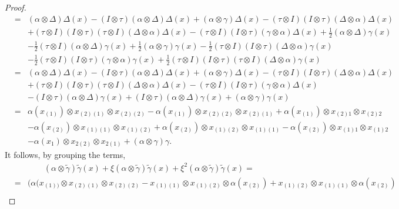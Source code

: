 \documentclass{article}
\theoremstyle{definition}
\theoremstyle{remark}
\numberwithin{equation}{section}
\begin{document}
\begin{proof}
\begin{eqnarray}
&=&(\alpha\otimes\Delta)\Delta(x)-(I\otimes\tau)(\alpha\otimes\Delta)\Delta(x)+(\alpha\otimes\gamma)\Delta(x)
-(\tau\otimes I)(I\otimes\tau)(\Delta\otimes \alpha)\Delta(x)\nonumber\\
&&+(\tau\otimes I)(I\otimes\tau)(\tau\otimes I)(\Delta\otimes \alpha)\Delta(x)
-(\tau\otimes I)(I\otimes\tau)(\gamma\otimes \alpha)\Delta(x)+\frac{1}{2}(\alpha\otimes\Delta)\gamma(x)\nonumber\\
&&-\frac{1}{2}(\tau\otimes I)(\alpha\otimes\Delta)\gamma(x)+\frac{1}{2}(\alpha\otimes\gamma)\gamma(x)
-\frac{1}{2}(\tau\otimes I)(I\otimes\tau)(\Delta\otimes \alpha)\gamma(x)\nonumber\\
&&-\frac{1}{2}(\tau\otimes I)(I\otimes\tau)(\gamma\otimes \alpha)\gamma(x)
+\frac{1}{2}(\tau\otimes I)(I\otimes\tau)(\tau\otimes I)(\Delta\otimes \alpha)\gamma(x)\nonumber\\
&=&(\alpha\otimes\Delta)\Delta(x)-(I\otimes\tau)(\alpha\otimes\Delta)\Delta(x)+(\alpha\otimes\gamma)\Delta(x)
-(\tau\otimes I)(I\otimes\tau)(\Delta\otimes \alpha)\Delta(x)\nonumber\\
&&+(\tau\otimes I)(I\otimes\tau)(\tau\otimes I)(\Delta\otimes \alpha)\Delta(x)
-(\tau\otimes I)(I\otimes\tau)(\gamma\otimes \alpha)\Delta(x)\nonumber\\
&&-(I\otimes\tau)(\alpha\otimes\Delta)\gamma(x)+(I\otimes\tau)(\alpha\otimes\Delta)\gamma(x)
+(\alpha\otimes\gamma)\gamma(x)\nonumber\\
&=&\alpha(x_{(1)})\otimes x_{(2)(1)}\otimes x_{(2)(2)}-\alpha(x_{(1)})\otimes x_{(2)(2)}\otimes x_{(2)(1)}+\alpha(x_{(1)})\otimes x_{(2)1}\otimes x_{(2)2}\nonumber\\
&&-\alpha(x_{(2)})\otimes x_{(1)(1)}\otimes x_{(1)(2)}+\alpha(x_{(2)})\otimes x_{(1)(2)}\otimes x_{(1)(1)}-\alpha(x_{(2)})\otimes x_{(1)1}\otimes x_{(1)2}\nonumber\\
&&-\alpha(x_{1})\otimes x_{2(2)}\otimes x_{2(1)}+(\alpha\otimes\gamma)\gamma.\nonumber
\end{eqnarray}
It follows, by grouping the terms,
\begin{eqnarray}
 &&\qquad(\alpha\otimes\tilde\gamma)\tilde\gamma(x)+\xi(\alpha\otimes\tilde\gamma)\tilde\gamma(x)+\xi^2(\alpha\otimes\tilde\gamma)\tilde\gamma(x)=\nonumber\\
&=&\Big(\alpha(x_{(1))}\otimes x_{(2)(1)}\otimes x_{(2)(2)}-x_{(1)(1)}\otimes x_{(1)(2)}\otimes \alpha(x_{(2)})+x_{(1)(2)}\otimes x_{(1)(1)}\otimes \alpha(x_{(2)})\nonumber\\

\end{eqnarray}
\end{proof}
\end{document}
